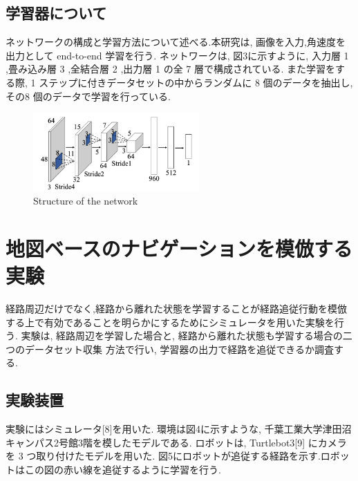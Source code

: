 \documentclass{jarticle}
\begin{document}
\subsection{学習器について}
ネットワークの構成と学習方法について述べる.本研究は,
画像を入力,角速度を出力として end-to-end 学習を行う.
ネットワークは, 図3に示すように, 入力層 1 ,畳み込み層 3 ,全結合層 2 ,出力層 1 の全 7 層で構成されている.
また学習をする際, 1 ステップに付きデータセットの中からランダムに 8 個のデータを抽出し, 
その8 個のデータで学習を行っている.


\begin{figure}[h!]
  \centering
   \includegraphics[height=30mm]{./figs/gaku2.png}
   \caption{Structure of the network}
\end{figure}


\section{地図ベースのナビゲーションを模倣する実験}

経路周辺だけでなく,経路から離れた状態を学習することが経路追従行動を模倣
する上で有効であることを明らかにするためにシミュレータを用いた実験を行う. 
実験は, 経路周辺を学習した場合と, 経路から離れた状態も学習する場合の二つのデータセット収集
方法で行い, 学習器の出力で経路を追従できるか調査する.

\subsection{実験装置}
実験にはシミュレータ[8]を用いた.
環境は図4に示すような, 千葉工業大学津田沼キャンパス2号館3階を模したモデルである.
ロボットは,  Turtlebot3[9] にカメラを 3 つ取り付けたモデルを用いた. 
図5にロボットが追従する経路を示す.ロボットはこの図の赤い線を追従するように学習を行う.
\end{document}
